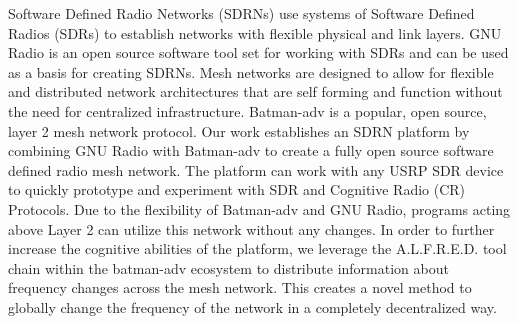 Software Defined Radio Networks (SDRNs)  use systems of Software Defined Radios (SDRs) to establish networks with flexible physical and link layers. GNU Radio is an open source software tool set for working with SDRs and can be used as a basis for creating SDRNs. Mesh networks are designed to allow for flexible and distributed network architectures that are self forming and function without the need for centralized infrastructure. Batman-adv is a popular, open source, layer 2 mesh network protocol. Our work establishes an SDRN platform by combining GNU Radio with Batman-adv to create a fully open source software defined radio mesh network. The platform can work with any USRP SDR device to quickly prototype and experiment with SDR and Cognitive Radio (CR) Protocols. Due to the flexibility of Batman-adv
and GNU Radio, programs acting above Layer 2 can utilize this network without any changes. In order to further increase the cognitive abilities of the platform, we leverage the A.L.F.R.E.D. tool chain within the batman-adv ecosystem to distribute information about frequency changes across the mesh network. This creates a novel method to globally change the frequency of the network in a completely decentralized way. 

